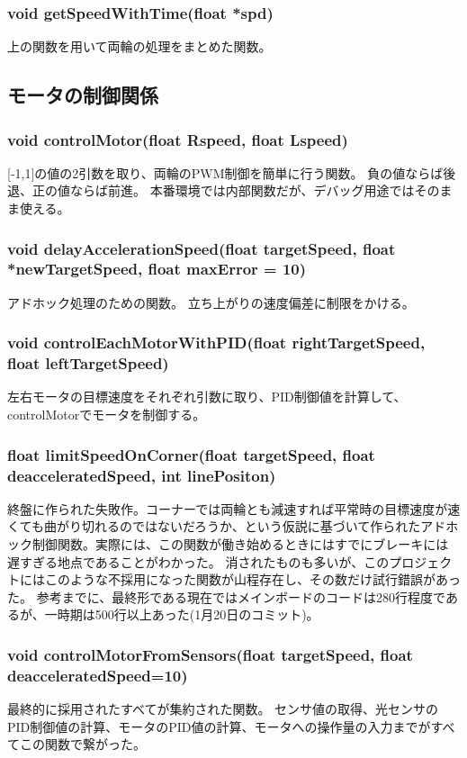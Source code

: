 \documentclass{ltjsreport}
\begin{document}
\subsubsection{void getSpeedWithTime(float *spd)}
上の関数を用いて両輪の処理をまとめた関数。
\subsection{モータの制御関係}
\subsubsection{void controlMotor(float Rspeed, float Lspeed)}
[-1,1]の値の2引数を取り、両輪のPWM制御を簡単に行う関数。
負の値ならば後退、正の値ならば前進。
本番環境では内部関数だが、デバッグ用途ではそのまま使える。

\subsubsection{void delayAccelerationSpeed(float targetSpeed, float *newTargetSpeed, float maxError = 10)}
アドホック処理のための関数。
立ち上がりの速度偏差に制限をかける。

\subsubsection{void controlEachMotorWithPID(float rightTargetSpeed, float leftTargetSpeed)}
左右モータの目標速度をそれぞれ引数に取り、PID制御値を計算して、controlMotorでモータを制御する。

\subsubsection{float limitSpeedOnCorner(float targetSpeed, float deacceleratedSpeed, int linePositon)}
終盤に作られた失敗作。コーナーでは両輪とも減速すれば平常時の目標速度が速くても曲がり切れるのではないだろうか、という仮説に基づいて作られたアドホック制御関数。実際には、この関数が働き始めるときにはすでにブレーキには遅すぎる地点であることがわかった。
消されたものも多いが、このプロジェクトにはこのような不採用になった関数が山程存在し、その数だけ試行錯誤があった。
参考までに、最終形である現在ではメインボードのコードは280行程度であるが、一時期は500行以上あった(1月20日のコミット)。

\subsubsection{void controlMotorFromSensors(float targetSpeed, float deacceleratedSpeed=10)}
最終的に採用されたすべてが集約された関数。
センサ値の取得、光センサのPID制御値の計算、モータのPID値の計算、モータへの操作量の入力までがすべてこの関数で繋がった。
\end{document}
